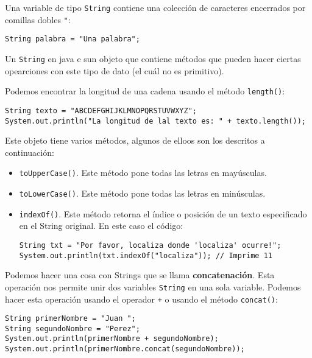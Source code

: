 \documentclass[12pt]{article}
\theoremstyle{largebreak}
\begin{document}
    Una variable de tipo \lstinline|String| contiene una colección de caracteres encerrados por comillas dobles \lstinline|"|:
    \begin{center}
        \lstinline|String palabra = "Una palabra";|
    \end{center}

    Un \lstinline|String| en java e sun objeto que contiene métodos que pueden hacer ciertas opearciones con este tipo de dato (el cuál no es primitivo).

    \begin{exa}
        Podemos encontrar la longitud de una cadena usando el método \lstinline|length()|:
        \begin{lstlisting}[caption={Longitud de un \lstinline|String|.},label=DescriptiveLabel]
String texto = "ABCDEFGHIJKLMNOPQRSTUVWXYZ";
System.out.println("La longitud de lal texto es: " + texto.length());
        \end{lstlisting}
    \end{exa}

    Este objeto tiene varios métodos, algunos de elloos son los descritos a continuación:
    \begin{itemize}
        \item \lstinline|toUpperCase()|. Este método pone todas las letras en mayúsculas.
        \item \lstinline|toLowerCase()|. Este método pone todas las letras en minúsculas.
        \item \lstinline|indexOf()|. Este método retorna el índice o posición de un texto especificado en el String original. En este caso el código:
        \begin{lstlisting}[caption={Localización de texto en un \lstinline|String|.},label=DescriptiveLabel]
String txt = "Por favor, localiza donde 'localiza' ocurre!";
System.out.println(txt.indexOf("localiza")); // Imprime 11
        \end{lstlisting}
    \end{itemize}

    Podemos hacer una cosa con Strings que se llama \textbf{concatenación}. Esta operación nos permite unir dos variables \lstinline|String| en una sola variable. Podemos hacer esta operación usando el operador \lstinline|+| o usando el método \lstinline|concat()|:
    \begin{lstlisting}[caption={Suma y Concatenación de Strings.},label=DescriptiveLabel]
String primerNombre = "Juan ";
String segundoNombre = "Perez";
System.out.println(primerNombre + segundoNombre);
System.out.println(primerNombre.concat(segundoNombre));
    \end{lstlisting}
\end{document}
